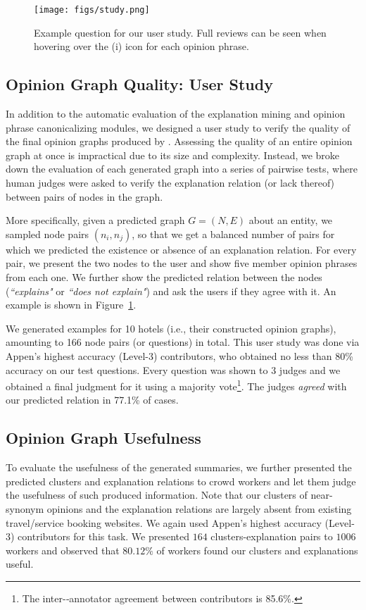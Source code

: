 \begin{figure}[!t]
    \centering
    \texttt{[image: figs/study.png]}
    \caption{Example question for our user study. Full reviews can be seen when hovering over the (i) icon for each opinion phrase.}
    \label{fig:study}
    \vspace{-3mm}
\end{figure}

\subsection{Opinion Graph Quality: User Study}
In addition to the automatic evaluation of the explanation mining and opinion phrase canonicalizing modules, we designed a user study to verify the quality of the final opinion graphs produced by \system. Assessing the quality of an entire opinion graph at once is impractical due to its size and complexity. Instead, we broke down the evaluation of each generated graph into a series of pairwise tests, where human judges were asked to verify the explanation relation (or lack thereof) between pairs of nodes in the graph. 

More specifically, given a predicted graph $G = (N, E)$ about an entity, we sampled node pairs $(n_i, n_j)$, so that we get a balanced number of pairs for which we predicted the existence or absence of an explanation relation. For every pair, we present the two nodes to the user and show five member opinion phrases from each one. We further show the predicted relation between the nodes (\textsl{``explains"} or \textsl{``does not explain"}) and ask the users if they agree with it. 
An example is shown in Figure~\ref{fig:study}. 

We generated examples for 10 hotels (i.e., their constructed opinion graphs), amounting to 166 node pairs (or questions) in total. This user study was done via Appen's highest accuracy (Level-3) contributors, who obtained no less than 80\% accuracy on our test questions. Every question was shown to 3 judges and we obtained a final judgment for it using a majority vote\footnote{The inter-‐annotator agreement between contributors is 85.6\%.}. The judges \textsl{agreed} with our predicted relation in 77.1\% of cases.

\subsection{Opinion Graph Usefulness}
To evaluate the usefulness of the generated summaries, we further presented the predicted clusters and explanation relations to crowd workers and let them judge the usefulness of such produced information. Note that our clusters of near-synonym opinions and the explanation relations are largely absent from existing travel/service booking websites. We again used Appen's highest accuracy (Level-3) contributors for this task. We presented $164$ clusters-explanation pairs to $1006$ workers and observed that $80.12\%$ of workers found our clusters and explanations useful. 

